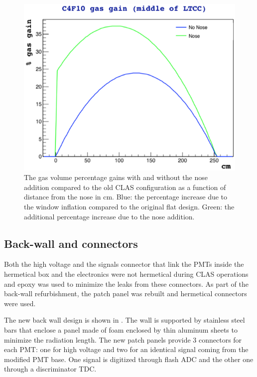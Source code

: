 \begin{figure}
	\centering
	\includegraphics[width=0.98\columnwidth, height=0.7\columnwidth]{img/noseVolume.png}
	\caption{The gas volume percentage gains with and without the nose addition compared to the old CLAS configuration as a function of
            distance from the nose in cm. Blue: the percentage increase due to the window inflation compared to the original flat design.
            Green: the additional percentage increase due to the nose addition.}
	\label{fig:noseVolume}
\end{figure}


\subsection{Back-wall and connectors}

Both the high voltage and the signals connector that link the PMTs inside the hermetical box and the electronics were not
hermetical during CLAS operations and epoxy was used to minimize the leaks from these connectors.
As part of the back-wall refurbishment, the patch panel was rebuilt and hermetical connectors were used.

The new back wall design is shown in . The wall is supported by stainless steel bars that enclose a panel made of foam enclosed by
thin aluminum sheets to minimize the radiation length.
The new patch panels provide 3 connectors for each PMT: one for high voltage and two for an identical signal coming from the modified PMT base.
One signal is digitized through flash ADC and the other one through a discriminator TDC.


